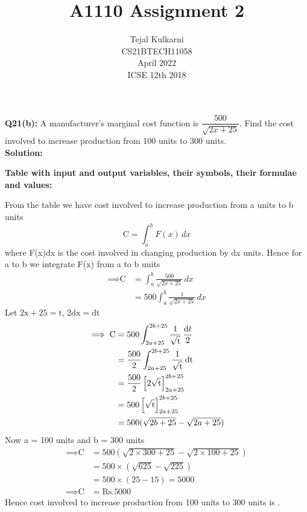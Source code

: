\documentclass[journal,12pt,two column]{IEEEtran}
\title{A1110 Assignment 2 }
\author{Tejal Kulkarni \\ CS21BTECH11058 \\\vspace*{20pt} April 2022 \\ ICSE 12th 2018 }
\begin{document}
\providecommand{\sbrak}[1]{\ensuremath{{}\left[#1\right]}}
\newcommand{\solution}{\noindent \textbf{Solution: }}
\maketitle

\textbf{ Q21(b):} A manufacturer's marginal cost function is $\dfrac{500}{\sqrt{2x+25}}$. Find the cost involved to increase production from 100 units to 300 units.\\
\solution
\begin{table}[ht!] 
\caption{\textbf{Table with input and output variables, their symbols, their formulae and values:}}
\label{table:1}

\end{table}

From the table we have cost involved to increase production from a units to b units
\begin{equation}
\text{C} = \int_{a}^{b} F(x) \,dx    
\end{equation}
where F(x)dx is the cost involved in changing production by dx units. Hence for a to b we integrate F(x) from a to b units
\begin{align}
\implies \text{C} &= \int_{a}^{b} \frac{500}{\sqrt{2x+25}} \,dx \\
                   &= 500 \int_{a}^{b} \frac{1}{\sqrt{2x+25}} \,dx  
\end{align}
Let $2\text{x} + 25 = \text{t}$, $2\text{dx} = \text{dt}$ \\
\begin{align}
\implies \text{C} &= 500 \int_{2a+25}^{2b+25} \frac{1}{\sqrt{\text{t}}} \,\frac{\text dt}{2} \\
&= \frac{500}{2} \int_{2a+25}^{2b+25} \frac{1}{\sqrt{\text{t}}} \,\text{dt} \\
&= \frac{500}{2} \sbrak{2\sqrt{\text{t}}}_{2a+25}^{2b+25} \\
&= 500 \sbrak{\sqrt{\text{t}}}_{2a+25}^{2b+25} \\
&= 500(\sqrt{2b + 25} - \sqrt{2a + 25})
\end{align}
Now a = 100 units and b = 300 units
\begin{align}
\implies \text{C} &= 500(\sqrt{2\times 300+25}-\sqrt{2\times 100+25})\\
                  &= 500\times(\sqrt{625} - \sqrt{225})\\
                  &= 500\times(25 - 15) = 5000 \\
\implies \text{C} &= \text{Rs.}5000
\end{align}
Hence cost involved to increase production from 100 units to 300 units is .
\end{document}
